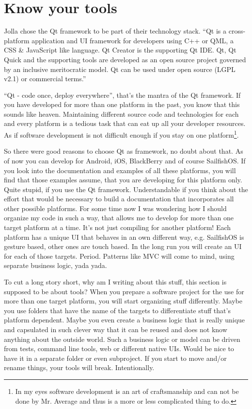 \section{Know your tools}\label{sec:tools}
%
Jolla chose the Qt framework to be part of their technology stack.
``Qt is a cross-platform application and UI framework for developers using C++ or QML, a CSS \& JavaScript like language. Qt Creator is the supporting Qt IDE.
Qt, Qt Quick and the supporting tools are developed as an open source project governed by an inclusive meritocratic model. Qt can be used under open source (LGPL v2.1) or commercial terms.''\cite{qt01}

``Qt - code once, deploy everywhere'', that's the mantra of the Qt framework. If you have developed for more than one platform in the past, you know that this sounds like heaven. Maintaining different source code and technologies for each and every platform is a tedious task that can eat up all your developer resources. As if software development is not difficult enough if you stay on one platform\footnote{In my eyes software development is an art of craftsmanship and can not be done by Mr. Average and thus is a more or less complicated thing to do.}.

So there were good reasons to choose Qt as framework, no doubt about that. As of now you can develop for Android, iOS, BlackBerry and of course SailfishOS. If you look into the documentation and examples of all these platforms, you will find that those examples assume, that you are developing for this platform only. Quite stupid, if you use the Qt framework. Understandable if you think about the effort that would be necessary to build a documentation that incorporates all other possible platforms. For some time now I was wondering how I should organize my code in such a way, that allows me to develop for more than one target platform at a time. It's not just compiling for another platform! Each platform has a unique UI that behaves in an own different way, e.g. SailfishOS is gesture based, other ones are touch based.
In the long run you will create an UI for each of those targets. Period. Patterns like MVC\cite{wiki01} will come to mind, using separate business logic, yada yada.

To cut a long story short, why am I writing about this stuff, this section is supposed to be about tools? When you prepare a software project for the use for more than one target platform, you will start organizing stuff differently. Maybe you use folders that have the name of the targets to differentiate stuff that's platform dependent. Maybe you even create a business logic that is really unique and capsulated in such clever way that it can be reused and does not know anything about the outside world. Such a business logic or model can be driven from tests, command line tools, web or different native UIs. Would be nice to have it in a separate folder or even subproject. If you start to move and/or rename things, your tools will break. Intentionally.

